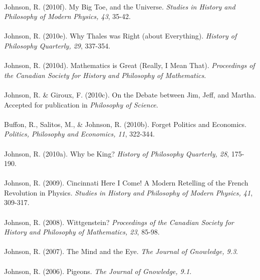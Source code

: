 \mbox{} \\

\setlength\leftskip{0.1in}
\setlength\parindent{-0.1in}

Johnson, R. (2010f). My Big Toe, and the Universe. \emph{Studies in History and
  Philosophy of Modern Physics, 43}, 35-42. \\
\mbox{} \\
Johnson, R. (2010e). Why Thales was Right (about Everything). \emph{History of Philosophy Quarterly, 29}, 337-354. \\
\mbox{} \\
Johnson, R. (2010d). Mathematics is Great (Really, I Mean That). \emph{Proceedings of the Canadian Society for History
  and Philosophy of Mathematics}. \\
\mbox{} \\
Johnson, R. \& Giroux, F. (2010c). On the Debate between Jim, Jeff, and Martha. Accepted for
publication in \emph{Philosophy of Science}. \\
\mbox{} \\
Buffon, R., Salitos, M., \& Johnson, R. (2010b). Forget Politics and Economics. \emph{Politics, Philosophy and Economics, 11},
322-344. \\
\mbox{} \\
Johnson, R. (2010a). Why be King? \emph{History of Philosophy Quarterly, 28}, 175-190. \\
\mbox{} \\
Johnson, R. (2009). Cincinnati Here I Come! A Modern Retelling of the French Revolution in Physics. \emph{Studies in History and Philosophy of Modern
  Physics, 41}, 309-317. \\
\mbox{} \\
Johnson, R. (2008). Wittgenstein? \emph{Proceedings of the Canadian Society for History
  and Philosophy of Mathematics, 23}, 85-98. \\
\mbox{} \\
Johnson, R. (2007). The Mind and the Eye. \emph{The Journal of Gnowledge,  9.3}. \\
\mbox{} \\
Johnson, R. (2006). Pigeons. \emph{The Journal of Gnowledge, 9.1}. \\
